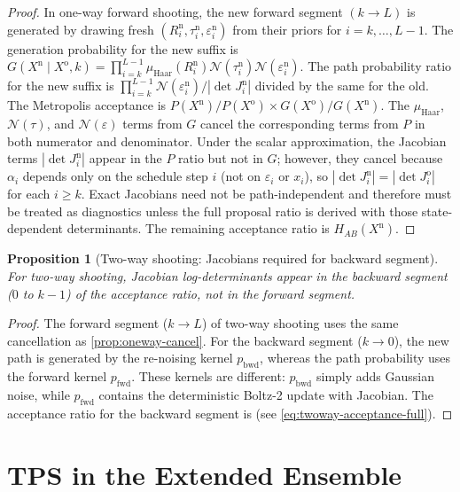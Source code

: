 \documentclass[11pt,a4paper]{article}
\newtheorem{proposition}[theorem]{Proposition}
\newcommand{\N}{\mathcal{N}}
\newcommand{\Haar}{\mu_{\mathrm{Haar}}}
\newcommand{\HAB}{H_{AB}}
\newcommand{\pfwd}{p_{\mathrm{fwd}}}
\newcommand{\pbwd}{p_{\mathrm{bwd}}}
\newcommand{\Xold}{X^{\mathrm{o}}}
\newcommand{\Xnew}{X^{\mathrm{n}}}
\begin{document}
\begin{proof}
In one-way forward shooting, the new forward segment $(k\to L)$ is
generated by drawing fresh $(R_i^{\mathrm{n}}, \tau_i^{\mathrm{n}},
\varepsilon_i^{\mathrm{n}})$ from their priors for $i=k,\ldots,L-1$.
The generation probability for the new suffix is
$G(\Xnew \mid \Xold, k) = \prod_{i=k}^{L-1}
\Haar(R_i^{\mathrm{n}})\N(\tau_i^{\mathrm{n}})\N(\varepsilon_i^{\mathrm{n}})$.
The path probability ratio for the new suffix is
$\prod_{i=k}^{L-1} \N(\varepsilon_i^{\mathrm{n}}) / |\det J_i^{\mathrm{n}}|$
divided by the same for the old.
The Metropolis acceptance is $P(\Xnew)/P(\Xold) \times G(\Xold)/G(\Xnew)$.
The $\Haar$, $\N(\tau)$, and $\N(\varepsilon)$ terms from $G$ cancel
the corresponding terms from $P$ in both numerator and denominator.
Under the scalar approximation, the Jacobian terms
$|\det J_i^{\mathrm{n}}|$ appear in the $P$ ratio but not in $G$;
however, they cancel because $\alpha_i$ depends only on the schedule
step $i$ (not on $\varepsilon_i$ or $x_i$), so
$|\det J_i^{\mathrm{n}}| = |\det J_i^{\mathrm{o}}|$ for each
$i \geq k$.  Exact Jacobians need not be path-independent and therefore
must be treated as diagnostics unless the full proposal ratio is derived
with those state-dependent determinants.
The remaining acceptance ratio is $\HAB(\Xnew)$.
\end{proof}

\begin{proposition}[Two-way shooting: Jacobians required for backward segment]
\label{prop:twoway-jacobian}
For two-way shooting, Jacobian log-determinants appear in the
backward segment ($0$ to $k-1$) of the acceptance ratio, not in the
forward segment.
\end{proposition}

\begin{proof}
The forward segment ($k\to L$) of two-way shooting uses the same
cancellation as \cref{prop:oneway-cancel}.  For the backward segment
($k\to 0$), the new path is generated by the re-noising kernel
$\pbwd$, whereas the path probability uses the forward kernel $\pfwd$.
These kernels are different: $\pbwd$ simply adds Gaussian noise, while
$\pfwd$ contains the deterministic Boltz-2 update with Jacobian.
The acceptance ratio for the backward segment is (see \cref{eq:twoway-acceptance-full}).
\end{proof}

\section{TPS in the Extended Ensemble}
\label{sec:extended-ensemble}
\end{document}
